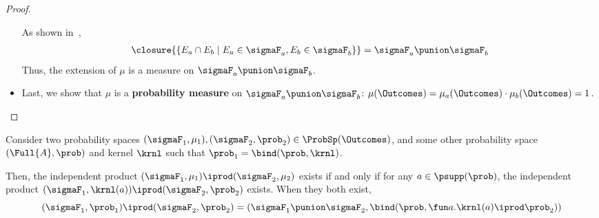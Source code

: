 \begin{proof}
\begin{itemize}
\begin{itemize}
   \end{itemize}

     As shown in~\cite{lilac},
\begin{align}
      \closure{\{E_a \cap E_b \mid E_a \in \sigmaF_a, E_b \in \sigmaF_b\}}
     = \sigmaF_a \punion \sigmaF_b
     \end{align}
Thus, the extension of $\mu$ is a measure on $\sigmaF_a \punion \sigmaF_b$.

    \item Last, we show that $\mu$ is a \textbf{probability measure} on
     $\sigmaF_a \punion \sigmaF_b$:
     $\mu(\Outcomes) = \mu_a(\Outcomes) \cdot \mu_b(\Outcomes) = 1$.
    \qedhere
 \end{itemize}
 \end{proof}

 \begin{lemma}
  \label{lemma:fibre-prod-exists}
    Consider two probability spaces
  $(\sigmaF_1, \mu_1), (\sigmaF_2, \prob_2) \in \ProbSp(\Outcomes)$,
  and some other probability space $(\Full{A}, \prob)$ and kernel $\krnl$
  such that $\prob_1 = \bind(\prob, \krnl)$.

  Then, the independent product
  $(\sigmaF_1, \mu_1) \iprod (\sigmaF_2, \mu_2)$
  exists if and only if
   for any $a \in \psupp(\prob)$,
   the independent product
   $(\sigmaF_1, \krnl(a)) \iprod (\sigmaF_2, \prob_2)$ exists.
When they both exist,
  \[
   (\sigmaF_1, \prob_1) \iprod (\sigmaF_2, \prob_2)
  = (\sigmaF_1 \punion \sigmaF_2,
     \bind(\prob, \fun a. \krnl(a) \iprod \prob_2))
  \]
 \end{lemma}



